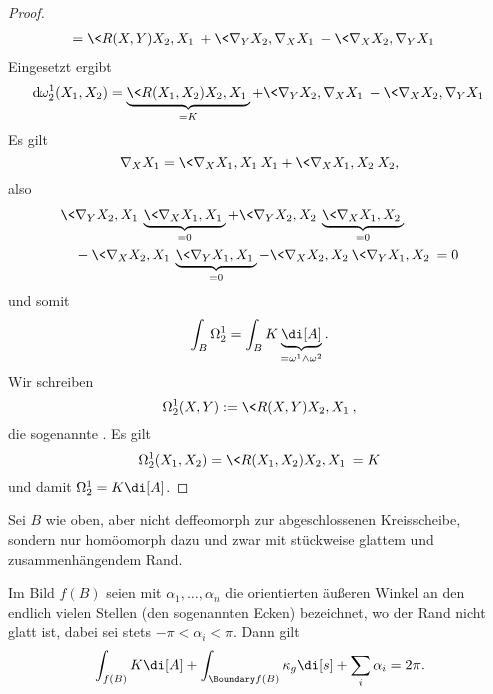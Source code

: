 \begin{thm}
\begin{proof}
\begin{align*}
			&= \<R(X,Y) X_2, X_1\> + \< \nabla_Y X_2, \nabla_X X_1\> - \< \nabla_X X_2, \nabla_Y X_1\>
		\end{align*}
		Eingesetzt ergibt
		\[
			\dx[\omega_2^1](X_1, X_2) = \underbrace{\<R(X_1, X_2) X_2, X_1\>}_{=K} + \< \nabla_Y X_2, \nabla_X X_1\> - \< \nabla_X X_2, \nabla_Y X_1\>
		\]
		Es gilt
		\[
			\nabla_X X_1 = \<\nabla_X X_1, X_1\> X_1 + \< \nabla_X X_1, X_2\> X_2,
		\]
		also
		\begin{align*}
			&\< \nabla_Y X_2, X_1\>\underbrace{\<\nabla_X X_1, X_1\>}_{=0} + \<\nabla_Y X_2, X_2\> \underbrace{\<\nabla_X X_1, X_2\>}_{=0} \\
			&\quad - \< \nabla_X X_2, X_1\> \underbrace{\< \nabla_Y X_1, X_1\>}_{=0} - \< \nabla_X X_2, X_2\> \< \nabla_Y X_1, X_2\>
			= 0
		\end{align*}
		und somit
		\[
			\int_B \Omega_2^1
			= \int_B K \underbrace{\di[A]}_{=\omega^1 \wedge \omega^2}.
		\]
		Wir schreiben
		\[
			\Omega_2^1(X, Y) := \<R(X,Y) X_2, X_1\>,
		\]
		die sogenannte .
		Es gilt
		\[
			\Omega_2^1(X_1, X_2) = \<R(X_1, X_2) X_2, X_1\> = K
		\]
		und damit $\Omega_2^1 = K \di[A]$.
	\end{proof}
\end{thm}

\begin{thm}
	Sei $B$ wie oben, aber nicht deffeomorph zur abgeschlossenen Kreisscheibe, sondern nur homöomorph dazu und zwar mit stückweise glattem und zusammenhängendem Rand.

	Im Bild $f(B)$ seien mit $\alpha_1, \dotsc, \alpha_n$ die orientierten äußeren Winkel an den endlich vielen Stellen (den sogenannten Ecken) bezeichnet, wo der Rand nicht glatt ist, dabei sei stets $-\pi < \alpha_i < \pi$.
	Dann gilt
	\[
		\int_{f(B)} K \di[A] + \int_{\Boundary f(B)} \kappa_g \di[s] + \sum_{i} \alpha_i = 2\pi.
	\]
\end{thm}

